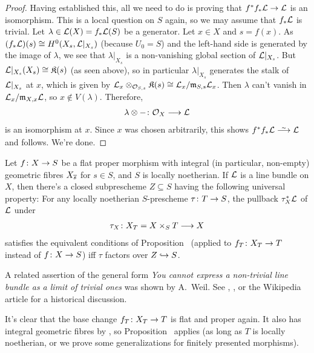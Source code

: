\documentclass[a4paper,parskip=half,numbers=enddot, DIV=12]{scrreprt}
\begin{document}
\begin{proof}
	Having established this, all we need to do is proving that $f^*f_*\Ll\morphism\Ll$ is an isomorphism. This is a local question on $S$ again, so we may assume that $f_*\mathcal{L}$ is trivial. Let $\lambda\in\mathcal{L}(X)=f_*\mathcal{L}(S)$ 
	be a generator. Let $x\in X$ and $s=f(x)$. As $(f_*\mathcal{L})(s)\cong H^0(X_s,\mathcal{L}|_{X_s})$ (because $U_0=S$) and the left-hand side is generated by the image of $\lambda$, we see that $\lambda|_{X_s}$ is a non-vanishing global section of $\mathcal{L}|_{X_s}$. But $\mathcal{L}|_{X_s}(X_s)\cong \mathfrak{K}(s)$ (as seen above), so in particular $\lambda|_{X_s}$ generates the stalk of $\mathcal{L}|_{X_s}$ at $x$, which is given by $\mathcal{L}_x\otimes_{\mathcal{O}_{S,s}}\mathfrak{K}(s)\cong \mathcal{L}_x/\mathfrak{m}_{S,s}\mathcal{L}_x$. Then $\lambda$ can't vanish in $\mathcal{L}_x/\mathfrak{m}_{X,x}\mathcal{L}$, so $x\notin V(\lambda)$. Therefore,
	\begin{align*}
		\lambda\otimes-\colon \Oo_X\morphism\Ll
	\end{align*}
	is an isomorphism at $x$. Since $x$ was chosen arbitrarily, this shows $f^*f_*\Ll\isomorphism\Ll$ and  follows. We're done.
\end{proof}
\begin{thm}
	Let $f\colon X\morphism S$ be a flat proper morphism with integral (in particular, non-empty) geometric fibres $X_{\overline{s}}$ for $s\in S$, and $S$ is locally noetherian. If $\mathcal{L}$ is a line bundle on $X$, then there's a closed subprescheme $Z\subseteq S$ having the following universal property: For any locally noetherian $S$-prescheme $\tau\colon T\morphism S$, the pullback $\tau_X^*\mathcal{L}$ of $\mathcal{L}$ under
	\begin{align*}
		\tau_X\colon X_T=X\times_ST\morphism X
	\end{align*}
	satisfies the equivalent conditions of Proposition~ (applied to $f_T\colon X_T\morphism T$ instead of $f\colon X\morphism S$) iff $\tau$ factors over $Z\monomorphism S$.
\end{thm}
\begin{rem}
	\begin{alphanumerate}
		\item A related assertion of the general form \emph{You cannot express a non-trivial line bundle as a limit of trivial ones} was shown by A.\ Weil. See \cite{cornell1986arithmetic}, \cite{mumford1974abelian}, or the Wikipedia article for a historical discussion.
		\item It's clear that the base change $f_T\colon X_T\morphism T$ is flat and proper again. It also has integral geometric fibres by \cite[ and ]{stacks-project}, so Proposition~ applies (as long as $T$ is locally noetherian, or we prove some generalizations for finitely presented morphisms).
	\end{alphanumerate}
\end{rem}
\end{document}
